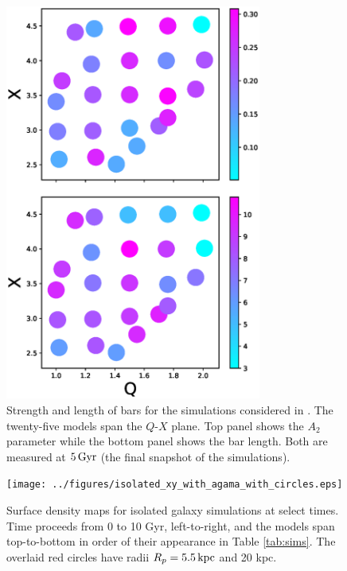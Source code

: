\begin{figure}
	\centering
	\includegraphics[width=0.75\textwidth]{../figures/wpd.eps}
	\caption{Strength and length of bars for the simulations
          considered in \citet{gauthier2006}.  The twenty-five models
          span the $Q$-$X$ plane.  Top panel shows the $A_2$ parameter
          while the bottom panel shows the bar length.  Both are
          measured at $5\,{\rm Gyr}$ (the final snapshot of the
          simulations).}
	\label{fig:qxa2}
\end{figure}


\begin{figure}
	\centering
	\texttt{[image: ../figures/isolated\_xy\_with\_agama\_with\_circles.eps]}
	\caption{Surface density maps for isolated galaxy simulations
          at select times. Time proceeds from 0 to 10 Gyr,
          left-to-right, and the models span top-to-bottom in order of
          their appearance in Table \ref{tab:sims}. The overlaid red
          circles have radii $R_p=5.5\,{\rm kpc}$ and 20 kpc.}
	\label{fig:face_on_isolated}
\end{figure}

